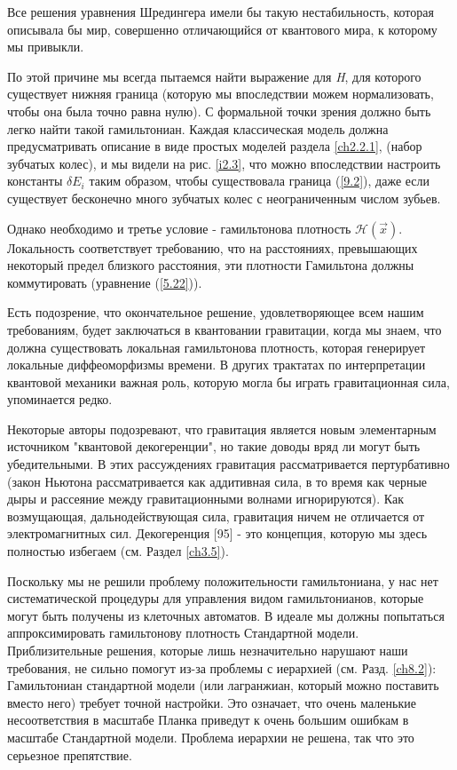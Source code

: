 \documentclass[main.tex]{subfiles}
\begin{document}
Все решения уравнения Шредингера имели бы такую нестабильность, которая описывала бы мир, совершенно отличающийся от квантового мира, к которому мы привыкли.

По этой причине мы всегда пытаемся найти выражение для \textit{H}, для которого существует нижняя граница (которую мы впоследствии можем нормализовать, чтобы она была точно равна нулю). С формальной точки зрения должно быть легко найти такой гамильтониан. Каждая классическая модель должна предусматривать описание в виде простых моделей раздела \ref{ch2.2.1}, (набор зубчатых колес), и мы видели на рис. \ref{i2.3}, что можно впоследствии настроить константы $\delta E_i$ таким образом, чтобы существовала граница (\ref{9.2}), даже если существует бесконечно много зубчатых колес с неограниченным числом зубьев.

Однако необходимо и третье условие - гамильтонова плотность $\mathcal H(\vec x)$. Локальность соответствует требованию, что на расстояниях, превышающих некоторый предел близкого расстояния, эти плотности Гамильтона должны коммутировать (уравнение (\ref{5.22})).

Есть подозрение, что окончательное решение, удовлетворяющее всем нашим требованиям, будет заключаться в квантовании гравитации, когда мы знаем, что должна существовать локальная гамильтонова плотность, которая генерирует локальные диффеоморфизмы времени. В других трактатах по интерпретации квантовой механики важная роль, которую могла бы играть гравитационная сила, упоминается редко.

Некоторые авторы подозревают, что гравитация является новым элементарным источником "квантовой декогеренции", но такие доводы вряд ли могут быть убедительными. В этих рассуждениях гравитация рассматривается пертурбативно (закон Ньютона рассматривается как аддитивная сила, в то время как черные дыры и рассеяние между гравитационными волнами игнорируются). Как возмущающая, дальнодействующая сила, гравитация ничем не отличается от электромагнитных сил. Декогеренция [95] - это концепция, которую мы здесь полностью избегаем (см. Раздел \ref{ch3.5}).

Поскольку мы не решили проблему положительности гамильтониана, у нас нет систематической процедуры для управления видом гамильтонианов, которые могут быть получены из клеточных автоматов. В идеале мы должны попытаться аппроксимировать гамильтонову плотность Стандартной модели. Приблизительные решения, которые лишь незначительно нарушают наши требования, не сильно помогут из-за проблемы с иерархией (см. Разд. \ref{ch8.2}): Гамильтониан стандартной модели (или лагранжиан, который можно поставить вместо него) требует точной настройки. Это означает, что очень маленькие несоответствия в масштабе Планка приведут к очень большим ошибкам в масштабе Стандартной модели. Проблема иерархии не решена, так что это серьезное препятствие.
\end{document}
